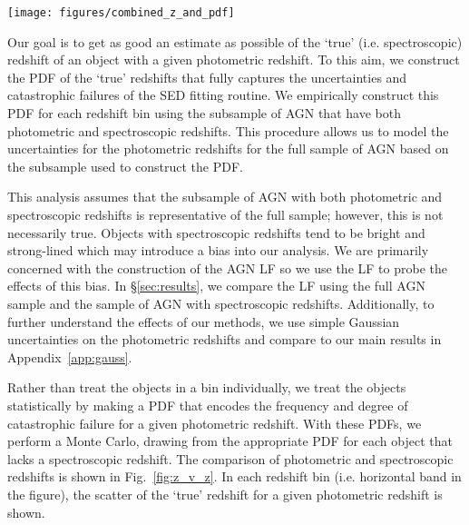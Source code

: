 \documentclass[twocolumn, trackchanges]{aastex63}
\begin{document}
\begin{figure*}[hptb]
\centering
\texttt{[image: figures/combined\_z\_and\_pdf]}
\caption{Comparison of photometric and spectroscopic redshifts for the X-ray and IR samples. The redshift bins are overlaid along the photometric redshift axis. In many redshift bins, there is a high rate of catastrophic failure in the photometric redshift SED-fitting routine. 
We aim to address this source of error by constructing a statistical description of the catastrophic failures within each redshift bin. \textit{Right inset}: The KDEs of redshift for objects with both photometric and  spectroscopic redshifts. These PDFs show the scatter of the spectroscopic redshifts for objects that have a photometric redshift in that redshift bin. The vertical lines indicate the redshift bin edges indication how likely an AGN with a given photometric redshift is to have a `true' redshift outside of that bin. When performing the Monte Carlo, each photometric redshift is replaced by a random pull from the appropriate KDE.}
\label{fig:z_v_z}
\end{figure*}

Our goal is to get as good an estimate as possible of the `true' (i.e. spectroscopic) redshift of an object with a given photometric redshift.
To this aim, we construct the PDF of the `true' redshifts that fully captures the uncertainties and catastrophic failures of the SED fitting routine.
We empirically construct this PDF for each redshift bin using the subsample of AGN that have both photometric and spectroscopic redshifts.
This procedure allows us to model the uncertainties for the photometric redshifts for the full sample of AGN based on the subsample used to construct the PDF.

This analysis assumes that the subsample of AGN with both photometric and spectroscopic redshifts is representative of the full sample; however, this is not necessarily true.
Objects with spectroscopic redshifts tend to be bright and strong-lined which may introduce a bias into our analysis.
We are primarily concerned with the construction of the AGN LF so we use the LF to probe the effects of this bias.
In \S\ref{sec:results}, we compare the LF using the full AGN sample and the sample of AGN with spectroscopic redshifts.
Additionally, to further understand the effects of our methods, we use simple Gaussian uncertainties on the photometric redshifts and compare to our main results in Appendix~\ref{app:gauss}.

Rather than treat the objects in a bin individually, we treat the objects statistically by making a PDF that encodes the frequency and degree of catastrophic failure for a given photometric redshift.
With these PDFs, we perform a Monte Carlo, drawing from the appropriate PDF for each object that lacks a spectroscopic redshift.
The comparison of photometric and spectroscopic redshifts is shown in Fig.~\ref{fig:z_v_z}.
In each redshift bin (i.e. horizontal band in the figure), the scatter of the `true' redshift for a given photometric redshift is shown.
\end{document}
